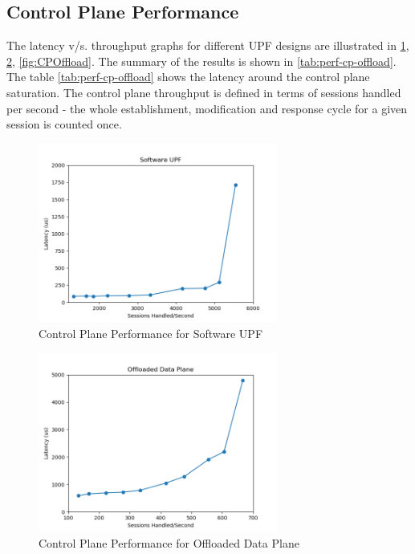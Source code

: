 \subsection{Control Plane Performance}
The latency v/s. throughput graphs for different UPF designs  are illustrated in \ref{fig:SoftwareUPF},
\ref{fig:DPOFfload}, \ref{fig:CPOffload}. The summary of the results is shown in \ref{tab:perf-cp-offload}. The table \ref{tab:perf-cp-offload}
shows the latency around the control plane saturation. The control plane throughput is defined in terms
of sessions handled per second - the whole establishment, modification and response cycle for a given session 
is counted once.
\begin{figure}[htbp]
    \centering
    \includegraphics[width=0.7\textwidth, keepaspectratio]{./fig/Results/SoftUPF.png}
    \caption{Control Plane Performance for Software UPF}
    \label{fig:SoftwareUPF}
\end{figure}
\begin{figure}[htbp]
    \centering
    \includegraphics[width=0.7\textwidth, keepaspectratio]{./fig/Results/DPOffload.png}
    \caption{Control Plane Performance for Offloaded Data Plane}
    \label{fig:DPOFfload}
\end{figure}
